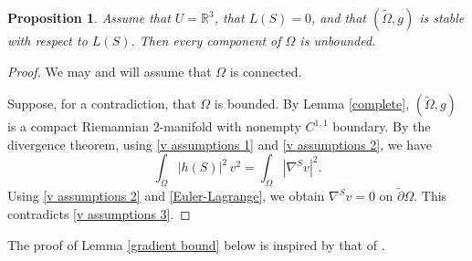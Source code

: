 \documentclass[11pt]{amsart}
\newtheorem{prop}{Proposition}
\begin{document}
\begin{prop} \label{no bounded components}
	Assume that $U=\mathbb{R}^3$, that $L(S)= 0$, and that $(\tilde \Omega,g)$ is stable with respect to $L(S)$. Then every component of $\Omega$ is unbounded. 
\end{prop}
\begin{proof}
	
	We may and will assume that $\Omega$ is connected.
	
	Suppose, for a contradiction, that $\Omega$ is bounded. By Lemma \ref{complete},  $(\tilde \Omega,g)$ is a compact Riemannian 2-manifold with nonempty $C^{1,1}$ boundary.	By the divergence theorem, using \eqref{v assumptions 1} and \eqref{v assumptions 2}, we have
	$$
	\int_\Omega |h(S)|^2\,v^2= \int_\Omega |\nabla^S v|^2.
	$$  
	Using \eqref{v assumptions 2} and \eqref{Euler-Lagrange}, we obtain $\nabla^Sv=0$  on $\tilde \partial \Omega$.
	This contradicts \eqref{v assumptions 3}.
\end{proof}

The proof of Lemma \ref{gradient bound} below is inspired by that of \cite[Proposition A.2]{KamburovWang}.
\end{document}
